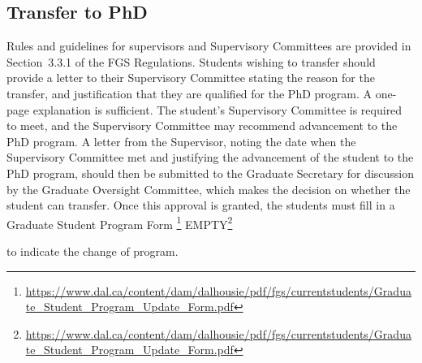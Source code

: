 \documentclass[12pt]{article}
\newcommand{\vote}[1]{\color{voteColor}\{#1\}\color{black}\marginpar[$\gg$OK?]{$\ll$OK?}}
\newcommand{\parnum}{\arabic{parcount}}
\newcounter{parcount}
\newcommand\p{\stepcounter{parcount}\leavevmode{\raisebox{0.2ex}{\scriptsize[\parnum]}}\hspace{0.2em}}
\newcommand\cp{\setcounter{parcount}{0}}
\newcommand{\furl}[2][EMPTY]%
    {\ifthenelse%
        {\equal{#1}{EMPTY}}%
        {\footnote{\footnotesize{\url{#2}}}}%
        {#1\footnote{\footnotesize{\url{#2}}}}%
    }
\newcommand{\supervisor}{Supervisor\xspace}
\newcommand{\supcom}{Supervisory Committee\xspace}
\newcommand{\gocom}{Graduate Oversight Committee\xspace}
\newcommand{\GS}{Graduate Secretary\xspace}
\newcommand{\fgsregs}{FGS Regulations\xspace}
\begin{document}
%
%
%
%
%
%
%
%
%
%
%

\subsection{\label{sec:transfer_to_phd}Transfer to PhD}

\cp

Rules and guidelines for supervisors and {\supcom}s are provided in
Section~3.3.1 of the \fgsregs.  Students wishing to transfer should provide a
letter to their \supcom stating the reason for the transfer, and justification
that they are qualified for the PhD program. A one-page explanation is
sufficient. The student's \supcom is required to meet, and the \supcom may
recommend advancement to the PhD program.  A letter from the \supervisor,
noting the date when the \supcom met and justifying the advancement of the
student to the PhD program, should then be submitted to the \GS for discussion
by the \gocom, which makes the decision on whether the student can transfer.
Once this approval is granted, the students must fill in a
Graduate Student Program Form\furl{https://www.dal.ca/content/dam/dalhousie/pdf/fgs/currentstudents/Graduate_Student_Program_Update_Form.pdf}
to indicate the change of program.
\end{document}
